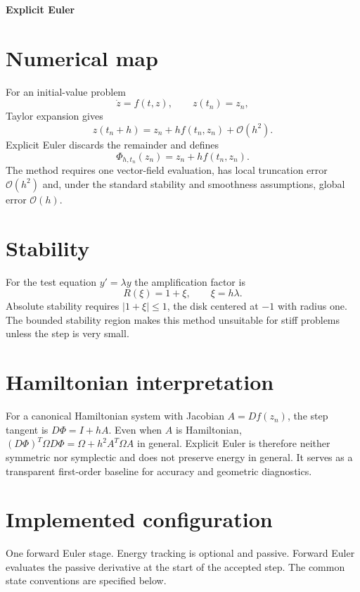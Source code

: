 \documentclass[11pt,a4paper]{article}
\begin{document}
\begin{center}
 {\LARGE\bfseries\color{gcblue}Explicit Euler}\par
 \vspace{0.35em}{\large First-order forward discretization}
\end{center}

\section{Numerical map}

For an initial-value problem
\[
\dot z=f(t,z),\qquad z(t_n)=z_n,
\]
Taylor expansion gives
\[
z(t_n+h)=z_n+h f(t_n,z_n)+\mathcal O(h^2).
\]
Explicit Euler discards the remainder and defines
\[
\Phi_{h,t_n}(z_n)=z_n+h f(t_n,z_n).
\]
The method requires one vector-field evaluation, has local truncation error
$\mathcal O(h^2)$ and, under the standard stability and smoothness assumptions,
global error $\mathcal O(h)$.

\section{Stability}

For the test equation $y'=\lambda y$ the amplification factor is
\[
R(\xi)=1+\xi,\qquad \xi=h\lambda.
\]
Absolute stability requires $|1+\xi|\leq1$, the disk centered at $-1$ with
radius one.  The bounded stability region makes this method unsuitable for
stiff problems unless the step is very small.

\section{Hamiltonian interpretation}

For a canonical Hamiltonian system with Jacobian $A=Df(z_n)$, the step tangent
is $D\Phi=I+hA$.  Even when $A$ is Hamiltonian,
$(D\Phi)^T\Omega D\Phi=\Omega+h^2A^T\Omega A$ in general.  Explicit Euler is
therefore neither symmetric nor symplectic and does not preserve energy in
general.  It serves as a transparent first-order baseline for accuracy and
geometric diagnostics.

\section{Implemented configuration}
One forward Euler stage. Energy tracking is optional and passive.
Forward Euler evaluates the passive derivative at the start of the accepted step.
The common state conventions are specified below.
\end{document}
